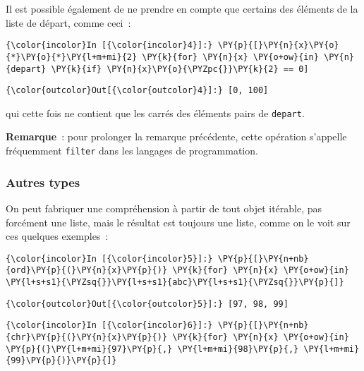     Il est possible également de ne prendre en compte que certains des
éléments de la liste de départ, comme ceci~:

    \begin{Verbatim}[commandchars=\\\{\}]
{\color{incolor}In [{\color{incolor}4}]:} \PY{p}{[}\PY{n}{x}\PY{o}{*}\PY{o}{*}\PY{l+m+mi}{2} \PY{k}{for} \PY{n}{x} \PY{o+ow}{in} \PY{n}{depart} \PY{k}{if} \PY{n}{x}\PY{o}{\PYZpc{}}\PY{k}{2} == 0]
\end{Verbatim}


\begin{Verbatim}[commandchars=\\\{\}]
{\color{outcolor}Out[{\color{outcolor}4}]:} [0, 100]
\end{Verbatim}
            
    qui cette fois ne contient que les carrés des éléments pairs de
\texttt{depart}.

    \textbf{Remarque}~: pour prolonger la remarque précédente, cette
opération s'appelle fréquemment \texttt{filter} dans les langages de
programmation.

    \hypertarget{autres-types}{%
\subsubsection{Autres types}\label{autres-types}}

    On peut fabriquer une compréhension à partir de tout objet itérable, pas
forcément une liste, mais le résultat est toujours une liste, comme on
le voit sur ces quelques exemples~:

    \begin{Verbatim}[commandchars=\\\{\}]
{\color{incolor}In [{\color{incolor}5}]:} \PY{p}{[}\PY{n+nb}{ord}\PY{p}{(}\PY{n}{x}\PY{p}{)} \PY{k}{for} \PY{n}{x} \PY{o+ow}{in} \PY{l+s+s1}{\PYZsq{}}\PY{l+s+s1}{abc}\PY{l+s+s1}{\PYZsq{}}\PY{p}{]}
\end{Verbatim}


\begin{Verbatim}[commandchars=\\\{\}]
{\color{outcolor}Out[{\color{outcolor}5}]:} [97, 98, 99]
\end{Verbatim}
            
    \begin{Verbatim}[commandchars=\\\{\}]
{\color{incolor}In [{\color{incolor}6}]:} \PY{p}{[}\PY{n+nb}{chr}\PY{p}{(}\PY{n}{x}\PY{p}{)} \PY{k}{for} \PY{n}{x} \PY{o+ow}{in} \PY{p}{(}\PY{l+m+mi}{97}\PY{p}{,} \PY{l+m+mi}{98}\PY{p}{,} \PY{l+m+mi}{99}\PY{p}{)}\PY{p}{]}
\end{Verbatim}


